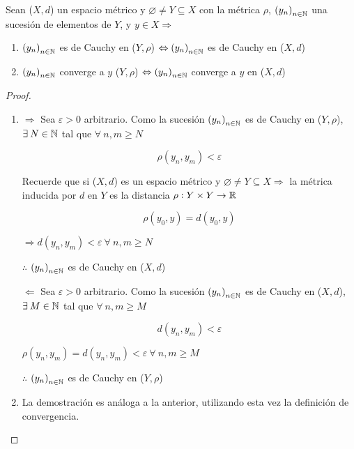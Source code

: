 \begin{theorem} \label{theom400}
    Sean ($X,d$) un espacio métrico y $\varnothing \neq Y \subseteq X$ con la métrica $\rho$, ${(y_n)}_{n \in \mathbb{N}}$ una sucesión de elementos de $Y$, y $y \in X \Rightarrow$

    \begin{enumerate}
        \item ${(y_n)}_{n \in \mathbb{N}}$ es de Cauchy en ($Y,\rho$) $ \Leftrightarrow {(y_n)}_{n \in \mathbb{N}}$ es de Cauchy en ($X,d$)
        \item ${(y_n)}_{n \in \mathbb{N}}$ converge a $y$ ($Y,\rho$) $\Leftrightarrow {(y_n)}_{n \in \mathbb{N}}$ converge a $y$ en ($X,d$)
    \end{enumerate} 
    \end{theorem}

\begin{proof}
    \begin{enumerate}
        \item $\Rightarrow$ Sea $\varepsilon > 0$ arbitrario. Como la sucesión ${(y_n)}_{n \in \mathbb{N}}$ es de Cauchy en ($Y, \rho$), $\exists \: N \in \mathbb{N}$ tal que $\forall \:n,m \geqslant N$

        $$\rho(y_n,y_m) < \varepsilon$$

        Recuerde que si ($X,d$) es un espacio métrico y $\varnothing \neq Y \subseteq X \Rightarrow$ la métrica inducida por $d$ en $Y$ es la distancia $\rho : Y \times Y \to \mathbb{R}$

        $$\rho(y_0,y) = d(y_0,y)$$

        $\Rightarrow d(y_n,y_m) < \varepsilon \: \forall \: n,m \geqslant N$

        $\therefore$  ${(y_n)}_{n \in \mathbb{N}}$ es de Cauchy en ($X, d$)

        $\Leftarrow$ Sea $\varepsilon > 0$ arbitrario. Como la sucesión ${(y_n)}_{n \in \mathbb{N}}$ es de Cauchy en ($X, d$), $\exists \: M \in \mathbb{N}$ tal que $\forall \:n,m \geqslant M$

        $$d(y_n,y_m) < \varepsilon$$

        $\rho(y_n,y_m) = d(y_n, y_m) < \varepsilon \: \forall \: n,m \geqslant M$

        $\therefore$  ${(y_n)}_{n \in \mathbb{N}}$ es de Cauchy en ($Y, \rho$)

        \item La demostración es análoga a la anterior, utilizando esta vez la definición de convergencia.
    \end{enumerate}
\end{proof}

